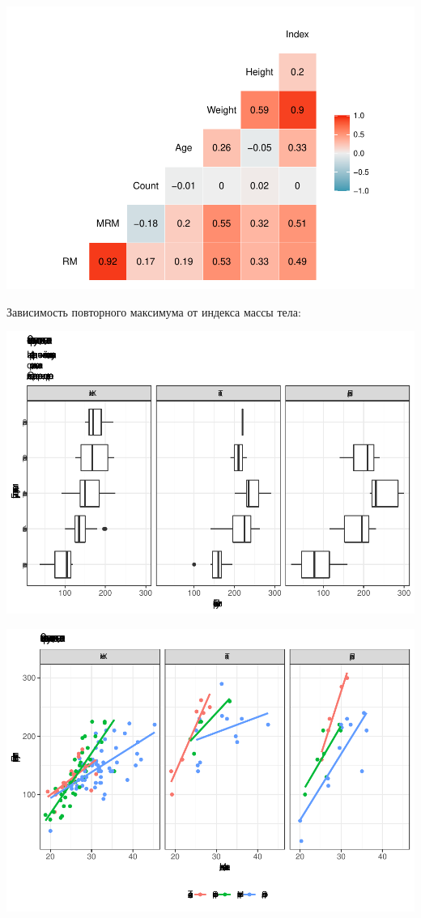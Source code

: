\documentclass[
]{article}
\begin{document}
\begin{center}\includegraphics{Regression-model-for-estimating-RM_files/figure-latex/unnamed-chunk-13-1} \end{center}

Зависимость повторного максимума от индекса массы тела:

\begin{center}\includegraphics[width=0.9\linewidth]{Regression-model-for-estimating-RM_files/figure-latex/unnamed-chunk-14-1} \end{center}

\begin{center}\includegraphics[width=0.9\linewidth]{Regression-model-for-estimating-RM_files/figure-latex/unnamed-chunk-14-2} \end{center}
\end{document}
